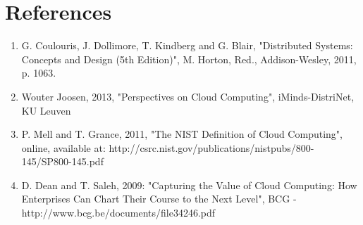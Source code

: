 %
%
%
%
%
%
%
%






\section*{References}

\begin{enumerate}[1]
	\item G. Coulouris, J. Dollimore, T. Kindberg and G. Blair, "Distributed Systems: Concepts and Design (5th Edition)", M. Horton, Red., Addison-Wesley, 2011, p. 1063.
	\item Wouter Joosen, 2013, "Perspectives on Cloud Computing", iMinds-DistriNet, KU Leuven
	\item P. Mell and T. Grance, 2011, "The NIST Definition of Cloud Computing", online, available at: http://csrc.nist.gov/publications/nistpubs/800-145/SP800-145.pdf
	\item D. Dean and T. Saleh, 2009: "Capturing the Value of Cloud Computing: How Enterprises Can Chart Their Course to the Next Level", BCG -http://www.bcg.be/documents/file34246.pdf
\end{enumerate}